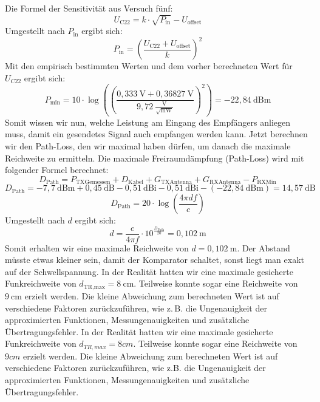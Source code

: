 Die Formel der Sensitivität aus Versuch fünf:
\begin{equation}
    U_{\text{C22}} = k \cdot \sqrt{P_{\text{in}}} - U_{\text{offset}}
\end{equation}
Umgestellt nach $P_{\text{in}}$ ergibt sich:
\begin{equation}
    P_{\text{in}} = \left(\frac{U_{\text{C22}} + U_{\text{offset}}}{k}\right)^2
\end{equation}
Mit den empirisch bestimmten Werten und dem vorher berechneten Wert für $U_{C22}$ ergibt sich:
\begin{equation}
    P_{\text{min}} = 10 \cdot \log\left(\left(\frac{0{,}333~\mathrm{V} + 0{,}36827~\mathrm{V}}{9{,}72~\frac{\mathrm{V}}{\sqrt{\mathrm{mW}}}}\right)^2\right) = -22{,}84~\mathrm{dBm}
\end{equation}
Somit wissen wir nun, welche Leistung am Eingang des Empfängers anliegen muss, damit ein gesendetes Signal auch empfangen werden kann.
Jetzt berechnen wir den Path-Loss, den wir maximal haben dürfen, um danach die maximale Reichweite zu ermitteln.
Die maximale Freiraumdämpfung (Path-Loss) wird mit folgender Formel berechnet:
\begin{equation}
    D_{\text{Path}} = P_{\text{TXGemessen}} + D_{\text{Kabel}} + G_{\text{TXAntenna}} + G_{\text{RXAntenna}} - P_{\text{RXMin}}
\end{equation}
\begin{equation}
    D_{\text{Path}} = -7{,}7~\mathrm{dBm} + 0{,}45~\mathrm{dB} -0{,}51~\mathrm{dBi} -0{,}51~\mathrm{dBi} - (-22{,}84~\mathrm{dBm}) = 14{,}57~\mathrm{dB}
\end{equation}
\begin{equation}
    D_{\text{Path}} = 20 \cdot \log\left(\frac{4 \pi d f}{c}\right)
\end{equation}
Umgestellt nach $d$ ergibt sich:
\begin{equation}
    d = \frac{c}{4 \pi f} \cdot 10^{\frac{D_{\text{Path}}}{20}}=0{,}102~\mathrm{m} 
\end{equation}
Somit erhalten wir eine maximale Reichweite von $d = 0{,}102~\mathrm{m}$. Der Abstand müsste etwas kleiner sein, damit der Komparator schaltet,
sonst liegt man exakt auf der Schwellspannung.
In der Realität hatten wir eine maximale gesicherte Funkreichweite von $d_{\text{TR,max}}=8~\mathrm{cm}$.
Teilweise konnte sogar eine Reichweite von $9~\mathrm{cm}$ erzielt werden.
Die kleine Abweichung zum berechneten Wert ist auf verschiedene Faktoren zurückzuführen, wie z.\,B. die Ungenauigkeit der approximierten Funktionen, Messungenauigkeiten und zusätzliche Übertragungsfehler.
In der Realität hatten wir eine maximale gesicherte Funkreichweite von $d_{TR,max}=8cm$.
Teilweise konnte sogar eine Reichweite von $9cm$ erzielt werden.
Die kleine Abweichung zum berechneten Wert ist auf verschiedene Faktoren zurückzuführen, wie z.B. die Ungenauigkeit der approximierten Funktionen, Messungenauigkeiten und zusätzliche Übertragungsfehler.

